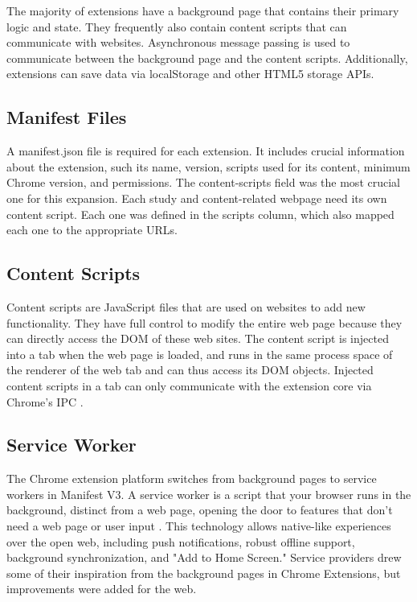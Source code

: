 The majority of extensions have a background page that contains their primary logic and state. They frequently also contain content scripts that can communicate with websites. Asynchronous message passing is used to communicate between the background page and the content scripts. Additionally, extensions can save data via localStorage and other HTML5 storage APIs.

\subsection*{Manifest Files}
A manifest.json file is required for each extension. It includes crucial information about the extension, such its name, version, scripts used for its content, minimum Chrome version, and permissions. The content-scripts field was the most crucial one for this expansion. Each study and content-related webpage need its own content script. Each one was defined in the scripts column, which also mapped each one to the appropriate URLs.

\subsection*{Content Scripts}
Content scripts are JavaScript files that are used on websites to add new functionality. They have full control to modify the entire web page because they can directly access the DOM of these web sites. The content script is injected into a tab when the web page is loaded, and runs in the same process space of the renderer of the web tab and can thus access its DOM objects. Injected content scripts in a tab can only communicate with the extension core via Chrome's IPC \autocite{liu2012chrome}.

\subsection*{Service Worker}
The Chrome extension platform switches from background pages to service workers in Manifest V3. A service worker is a script that your browser runs in the background, distinct from a web page, opening the door to features that don't need a web page or user input \autocite{chrome2021service}. This technology allows native-like experiences over the open web, including push notifications, robust offline support, background synchronization, and "Add to Home Screen." Service providers drew some of their inspiration from the background pages in Chrome Extensions, but improvements were added for the web.

